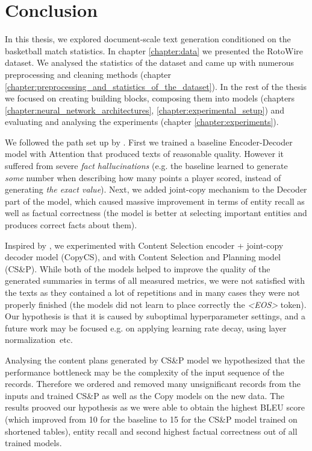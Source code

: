\chapter*{Conclusion}

In this thesis, we explored document-scale text generation conditioned on the basketball match statistics. In chapter \ref{chapter:data} we presented the RotoWire dataset. We analysed the statistics of the dataset and came up with numerous preprocessing and cleaning methods (chapter \ref{chapter:preprocessing_and_statistics_of_the_dataset}). In the rest of the thesis we focused on creating building blocks, composing them into models (chapters \ref{chapter:neural_network_architectures}, \ref{chapter:experimental_setup}) and evaluating and analysing the experiments (chapter \ref{chapter:experiments}).

We followed the path set up by \citet{wiseman2017}. First we trained a baseline Encoder-Decoder model with Attention that produced texts of reasonable quality. However it suffered from severe \emph{fact hallucinations} (e.g. the baseline learned to generate \emph{some} number when describing how many points a player scored, instead of generating \emph{the exact value}). Next, we added joint-copy mechanism to the Decoder part of the model, which caused massive improvement in terms of entity recall as well as factual correctness (the model is better at selecting important entities and produces correct facts about them).

Inspired by \citet{puduppully2019datatotext}, we experimented with Content Selection encoder + joint-copy decoder model (CopyCS), and with Content Selection and Planning model (CS\&P). While both of the models helped to improve the quality of the generated summaries in terms of all measured metrics, we were not satisfied with the texts as they contained a lot of repetitions and in many cases they were not properly finished (the models did not learn to place correctly the \emph{\textless EOS\textgreater} token). Our hypothesis is that it is caused by suboptimal hyperparameter settings, and a future work may be focused e.g. on applying learning rate decay, using layer normalization~etc.

Analysing the content plans generated by CS\&P model we hypothesized that the performance bottleneck may be the complexity of the input sequence of the records. Therefore we ordered and removed many unsignificant records from the inputs and trained CS\&P as well as the Copy models on the new data. The results prooved our hypothesis as we were able to obtain the highest BLEU score (which improved from 10 for the baseline to 15 for the CS\&P model trained on shortened tables), entity recall and second highest factual correctness out of all trained models.


